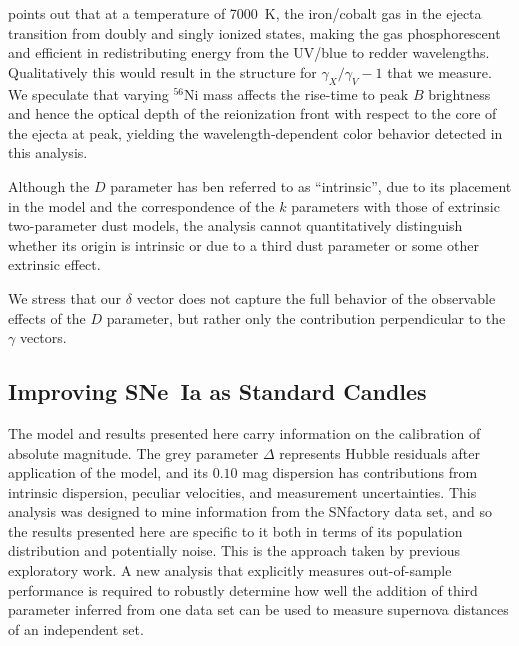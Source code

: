 \documentclass{aastex61}   	%
\begin{document}
\citet{2006ApJ...649..939K} points out that at a temperature of 7000~K, the iron/cobalt gas in the ejecta transition
from doubly and singly ionized states, making the gas phosphorescent and efficient in redistributing energy from the UV/blue to redder
wavelengths.  Qualitatively this would result in the structure for $\gamma_X/\gamma_V-1$ that we measure.
We speculate that varying $^{56}$Ni mass affects the rise-time to peak $B$ brightness and hence the optical depth
of the reionization front with respect to the core of the ejecta at peak, yielding the wavelength-dependent color behavior
detected in this analysis.



Although the $D$ parameter has ben referred to as ``intrinsic'', due to its placement in the model and the correspondence
of the $k$ parameters with those of extrinsic two-parameter dust models, the analysis cannot quantitatively distinguish
whether its origin is intrinsic or due to a third dust parameter or some other extrinsic effect.

We stress that our $\delta$ vector does not capture the full behavior of the observable effects of the $D$ parameter, but rather only
the contribution perpendicular to the $\gamma$ vectors.

\subsection{Improving SNe~Ia as Standard Candles}
The model and results presented here
carry information on the calibration of absolute magnitude.  The grey parameter $\Delta$ represents Hubble residuals after
application of the model, and its  $0.10$ mag dispersion has contributions from intrinsic dispersion, peculiar velocities, and
measurement uncertainties.
This analysis was designed to mine information from the SNfactory data set, and so the results presented here
are specific to it both in terms of its population distribution and potentially noise.  This is the approach taken by previous
exploratory work.
A new analysis that explicitly measures out-of-sample performance is required to robustly determine how
well the addition of third parameter inferred from one data set can be used to measure supernova distances
of an independent set.
\end{document}
